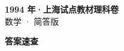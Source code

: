 \documentclass[zihao=-4, a4paper]{ctexart}
\begin{document}
\begin{center}
  {\Large\bfseries 1994 年·上海试点教材理科卷}\\[4pt]
  {\large 数学 · 简答版}
\end{center}
\medskip
{}

\clearpage
{}
\begin{center}{\Large\bfseries 答案速查}\end{center}
\medskip

\end{document}
